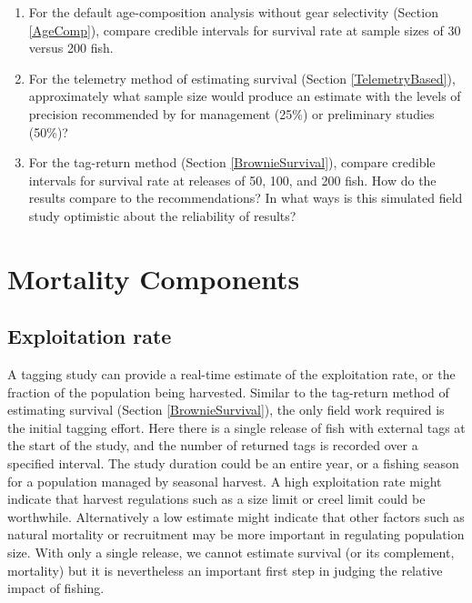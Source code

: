 \documentclass[
]{krantz}
\begin{document}
\begin{enumerate}
\def\labelenumi{\arabic{enumi}.}
\item
  For the default age-composition analysis without gear selectivity (Section \ref{AgeComp}), compare credible intervals for survival rate at sample sizes of 30 versus 200 fish.
\item
  For the telemetry method of estimating survival (Section \ref{TelemetryBased}), approximately what sample size would produce an estimate with the levels of precision recommended by \citet{robson.regier1964} for management (25\%) or preliminary studies (50\%)?
\item
  For the tag-return method (Section \ref{BrownieSurvival}), compare credible intervals for survival rate at releases of 50, 100, and 200 fish. How do the results compare to the \citet{robson.regier1964} recommendations? In what ways is this simulated field study optimistic about the reliability of results?
\end{enumerate}

\hypertarget{Mortality}{%
\chapter{Mortality Components}\label{Mortality}}

\hypertarget{ExpRate}{%
\section{Exploitation rate}\label{ExpRate}}

A tagging study can provide a real-time estimate of the exploitation rate, or the fraction of the population being harvested. Similar to the tag-return method of estimating survival (Section \ref{BrownieSurvival}), the only field work required is the initial tagging effort. Here there is a single release of fish with external tags at the start of the study, and the number of returned tags is recorded over a specified interval. The study duration could be an entire year, or a fishing season for a population managed by seasonal harvest. A high exploitation rate might indicate that harvest regulations such as a size limit or creel limit could be worthwhile. Alternatively a low estimate might indicate that other factors such as natural mortality or recruitment may be more important in regulating population size. With only a single release, we cannot estimate survival (or its complement, mortality) but it is nevertheless an important first step in judging the relative impact of fishing.
\end{document}
